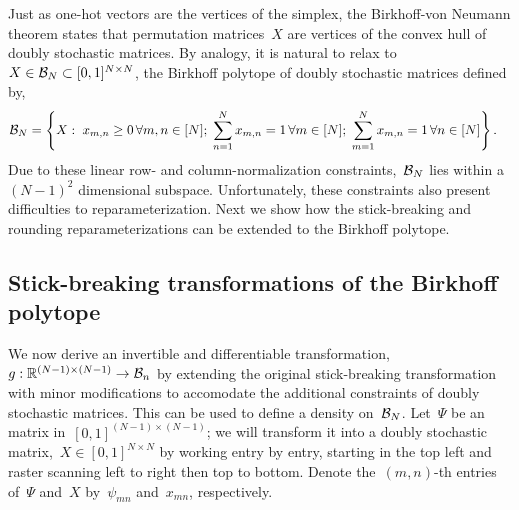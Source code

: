 Just as one-hot vectors are the vertices of the simplex, the
Birkhoff-von Neumann theorem states that permutation matrices~$X$ are
vertices of the convex hull of doubly stochastic matrices. By analogy,
it is natural to relax to~${X \in \mathcal{B}_N \subset [0,1]^{N \times N}}$,
the Birkhoff polytope of doubly stochastic matrices defined by,
\begin{align}
  \mathcal{B}_N &= \left \{X: \;
           x_{m,n} \geq 0 \, \forall m,n \in [N]; \;
           \sum_{n=1}^N x_{m,n} = 1 \, \forall m \in [N]; \;
           \sum_{m=1}^N x_{m,n} =1 \, \forall n \in [N]\right\}.
\end{align}
Due to these linear row- and column-normalization
constraints,~$\mathcal{B}_N$ lies within a~${(N-1)^2}$ dimensional subspace.
Unfortunately, these constraints also present difficulties to
reparameterization.  Next we show how the stick-breaking and rounding
reparameterizations can be extended to the Birkhoff polytope.

\subsection{Stick-breaking transformations of the Birkhoff polytope}
We now derive an invertible and differentiable
transformation,~$g: \mathbb{R}^{(N-1) \times (N-1)} \to \mathcal{B}_n$ by
extending the original stick-breaking transformation with minor
modifications to accomodate the additional constraints of doubly
stochastic matrices. This can be used to define a density
on~$\mathcal{B}_N$. Let~$\Psi$ be an matrix
in~${[0,1]^{(N-1) \times (N-1)}}$; we will transform it into a doubly
stochastic matrix,~$X \in [0,1]^{N \times N}$ by working entry by
entry, starting in the top left and raster scanning left to right then
top to bottom. Denote the~$(m,n)$-th entries of~$\Psi$ and~$X$
by~$\psi_{mn}$ and~${x}_{mn}$, respectively.

